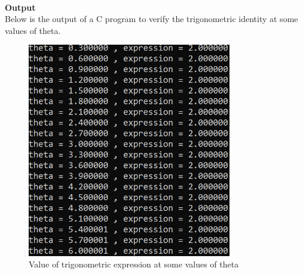 \documentclass[journal,12pt,twocolumn]{IEEEtran}
\begin{document}
\\\textbf{\Large{Output}}\\[.1in]
Below is the output of a C program to verify the trigonometric identity at some values of theta.\\
\begin{figure}[H]
\includegraphics[width=3.5in]{fig.png}
\caption{Value of trigonometric expression at some values of theta}
\end{figure}
\end{document}
